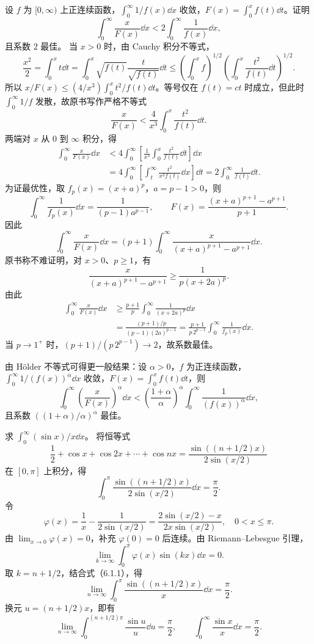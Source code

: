 设 $f$ 为 $[0,\infty)$ 上正连续函数，$\int_0^\infty1/f(x)\dd x$ 收敛，$F(x)=\int_0^xf(t)\dd t$。证明
\[
\int_0^\infty\frac{x}{F(x)}\dd x<2\int_0^\infty\frac1{f(x)}\dd x,
\]
且系数 $2$ 最佳。
\prooftext 当 $x>0$ 时，由 Cauchy 积分不等式，
\[
\frac{x^2}{2}=\int_0^xt\dd t
=\int_0^x\sqrt{f(t)}\frac{t}{\sqrt{f(t)}}\dd t
\le\left(\int_0^xf\right)^{1/2}\left(\int_0^x\frac{t^2}{f(t)}\dd t\right)^{1/2}.
\]
所以 $x/F(x)\le(4/x^3)\int_0^xt^2/f(t)\dd t$。等号仅在 $f(t)=ct$ 时成立，但此时 $\int_0^\infty1/f$ 发散，故原书写作严格不等式
\[
\frac{x}{F(x)}<\frac4{x^3}\int_0^x\frac{t^2}{f(t)}\dd t.
\]
两端对 $x$ 从 $0$ 到 $\infty$ 积分，得
\begin{align*}
\int_0^\infty\frac{x}{F(x)}\dd x
&<4\int_0^\infty\left[\frac1{x^3}\int_0^x\frac{t^2}{f(t)}\dd t\right]\dd x\\
&=4\int_0^\infty\left[\int_t^\infty\frac{t^2}{x^3f(t)}\dd x\right]\dd t
=2\int_0^\infty\frac1{f(t)}\dd t.
\end{align*}
为证最优性，取 $f_p(x)=(x+a)^p$，$a=p-1>0$，则
\[
\int_0^\infty\frac1{f_p(x)}\dd x=\frac1{(p-1)a^{p-1}},\qquad
F(x)=\frac{(x+a)^{p+1}-a^{p+1}}{p+1}.
\]
因此
\[
\int_0^\infty\frac{x}{F(x)}\dd x
=(p+1)\int_0^\infty\frac{x}{(x+a)^{p+1}-a^{p+1}}\dd x.
\]
原书称不难证明，对 $x>0$、$p\ge1$，有
\[
\frac{x}{(x+a)^{p+1}-a^{p+1}}\ge\frac1{p(x+2a)^p}.
\]
由此
\begin{align*}
\int_0^\infty\frac{x}{F(x)}\dd x
&\ge\frac{p+1}{p}\int_0^\infty\frac1{(x+2a)^p}\dd x\\
&=\frac{(p+1)/p}{(p-1)(2a)^{p-1}}
=\frac{p+1}{p\,2^{p-1}}\int_0^\infty\frac1{f_p(x)}\dd x.
\end{align*}
当 $p\to1^+$ 时，$(p+1)/(p\,2^{p-1})\to2$，故系数最佳。

由 Hölder 不等式可得更一般结果：设 $\alpha>0$，$f$ 为正连续函数，$\int_0^\infty1/(f(x))^\alpha\dd x$ 收敛，$F(x)=\int_0^xf(t)\dd t$，则
\[
\int_0^\infty\left(\frac{x}{F(x)}\right)^\alpha\dd x
<\left(\frac{1+\alpha}{\alpha}\right)^\alpha\int_0^\infty\frac1{(f(x))^\alpha}\dd x,
\]
且系数 $((1+\alpha)/\alpha)^\alpha$ 最佳。

求 $\int_0^\infty(\sin x)/x\dd x$。
\sol 将恒等式
\[
\frac12+\cos x+\cos2x+\cdots+\cos nx
=\frac{\sin((n+1/2)x)}{2\sin(x/2)}
\]
在 $[0,\pi]$ 上积分，得
\begin{equation}
\int_0^\pi\frac{\sin((n+1/2)x)}{2\sin(x/2)}\dd x=\frac\pi2.\tag{6.1.1}
\end{equation}
令
\[
\varphi(x)=\frac1x-\frac1{2\sin(x/2)}
=\frac{2\sin(x/2)-x}{2x\sin(x/2)},\quad0<x\le\pi.
\]
由 $\lim_{x\to0}\varphi(x)=0$，补充 $\varphi(0)=0$ 后连续。由 Riemann--Lebesgue 引理，
\[
\lim_{k\to\infty}\int_0^\pi\varphi(x)\sin(kx)\dd x=0.
\]
取 $k=n+1/2$，结合式（6.1.1），得
\[
\lim_{n\to\infty}\int_0^\pi\frac{\sin((n+1/2)x)}x\dd x=\frac\pi2.
\]
换元 $u=(n+1/2)x$，即有
\[
\lim_{n\to\infty}\int_0^{(n+1/2)\pi}\frac{\sin u}u\dd u=\frac\pi2,
\qquad\int_0^\infty\frac{\sin x}x\dd x=\frac\pi2.
\]

